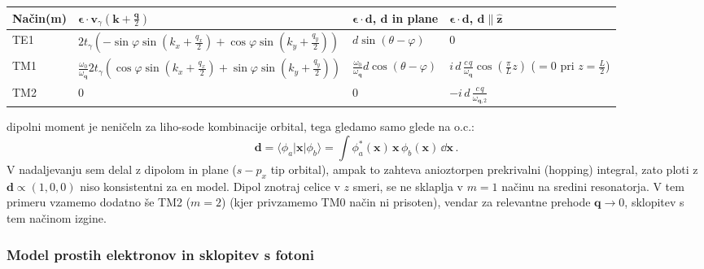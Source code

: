 \documentclass[a4paper,10pt]{article}
\renewcommand{\vec}[1]{\mathbf{#1}}
\begin{document}
\begin{table}[h!]
\centering
\begin{tabular}{|l|l|l|l|}
  \hline
Način(m) & $\vec{\bm{\epsilon}} \cdot \vec{v}_\gamma\left(\vec{k} + \frac{\vec{q}}{2}\right)$ & $\vec{\bm{\epsilon}} \cdot \vec{d}$, $\vec{d}$ in plane & $\vec{\bm{\epsilon}} \cdot \vec{d}$, $\vec{d} \parallel \hat{\mathbf{z}}$ \\
  \hline

TE1 & $2 t_\gamma \left( -\sin\varphi \sin\left(k_x + \frac{q_x}{2}\right) + \cos\varphi \sin\left(k_y + \frac{q_y}{2}\right) \right)$ & $d \sin(\theta - \varphi)$ & $0$ \\
  \hline

TM1 & $\frac{\omega_0}{\omega_{\vec{q}}} 2 t_\gamma \left( \cos\varphi \sin\left(k_x + \frac{q_x}{2}\right) + \sin\varphi \sin\left(k_y + \frac{q_y}{2}\right) \right)$ & $\frac{\omega_0}{\omega_{\vec{q}}} d \cos(\theta - \varphi)$ & $i\, d\, \frac{c\, q}{\omega_{\vec{q}}} \cos\left(\frac{\pi}{L} z\right)$ ($= 0$ pri $z = \frac{L}{2}$) \\
  \hline

TM2 & 0 & 0 & $-i\, d\, \frac{c\, q}{\omega_{\vec{q},2}}$  \\
  \hline
\end{tabular}
\end{table} \noindent
dipolni moment je neničeln za liho-sode kombinacije orbital, tega gledamo samo glede na o.c.:
\begin{equation}
\vec{d} = \langle \phi_a | \vec{x} | \phi_b \rangle = \int \phi_a^*(\vec{x}) \, \vec{x} \, \phi_b(\vec{x}) \, \dd{\vec{x}}\,.
\end{equation}
V nadaljevanju sem delal z dipolom in plane ($s-p_x$ tip orbital), ampak to zahteva anioztorpen prekrivalni (hopping) integral, zato ploti z $\vec{d}\propto (1, 0, 0)$ niso konsistentni za en model. Dipol znotraj celice v $z$ smeri, se ne sklaplja v $m=1$ načinu na sredini resonatorja. V tem primeru vzamemo dodatno še TM2 ($m=2$) (kjer privzamemo TM0 način ni prisoten), vendar za relevantne prehode $\vec{q}\to 0$, sklopitev s tem načinom izgine.  
\subsubsection{Model prostih elektronov in sklopitev s fotoni}
\end{document}
